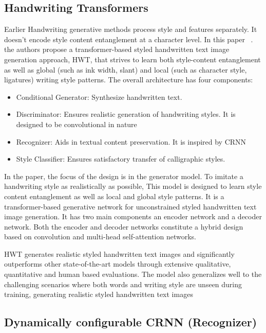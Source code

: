 \documentclass[10pt,twocolumn,letterpaper]{article}
\begin{document}
\subsection{Handwriting Transformers}
\label{subsec: HWT}
Earlier Handwriting generative methods process style and features separately. It doesn't encode style content entanglement at a character level. In this paper ~\cite{HWT}. the authors propose a transformer-based styled handwritten text image generation approach, HWT, that strives to learn both style-content entanglement as well as global (such as ink width, slant) and local (such as character style, ligatures) writing style patterns. The overall architecture has four components: 
\begin{itemize}
  \item Conditional Generator: Synthesize handwritten text.
  \item Discriminator: Ensures realistic generation of handwriting styles. It is designed to be convolutional in nature
  \item Recognizer: Aids in textual content preservation. It is inspired by CRNN
  \item Style Classifier: Ensures satisfactory transfer of calligraphic styles.
\end{itemize}

In the paper, the focus of the design is in the generator model. To imitate a handwriting style as realistically as possible, This model is designed to learn style content entanglement as well as local and global style patterns.  It is a transformer-based generative network for unconstrained styled handwritten text image generation.  It has two main components an encoder network and a decoder network.  Both the encoder and decoder networks constitute a hybrid design based on convolution and multi-head self-attention networks.

HWT generates realistic styled handwritten text images and significantly outperforms other state-of-the-art models through extensive qualitative, quantitative and human based evaluations. The model also generalizes well to the challenging scenarios where both words and writing style are unseen during training, generating realistic styled handwritten text images 

\subsection{Dynamically configurable CRNN (Recognizer)}
\label{subsec: CRNN}
\end{document}
